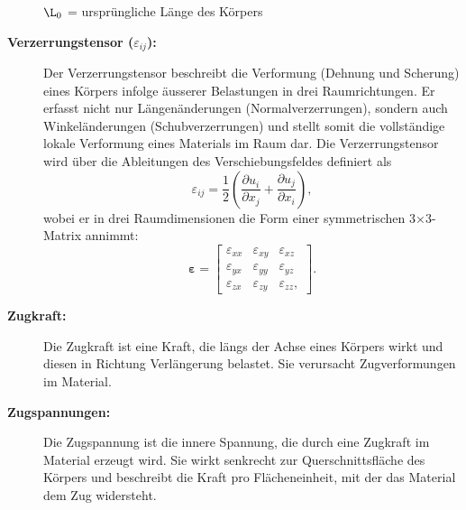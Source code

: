 \begin{description}
	$\L_0$ = ursprüngliche Länge des Körpers
	
\item[\textbf{Verzerrungstensor ($\varepsilon_{ij}$):}] Der Verzerrungstensor beschreibt die Verformung (Dehnung und Scherung) eines Körpers infolge äusserer Belastungen in drei Raumrichtungen. 
Er erfasst nicht nur Längenänderungen (Normalverzerrungen), sondern auch Winkeländerungen (Schubverzerrungen) und stellt somit die vollständige lokale Verformung eines Materials im Raum dar.
Die Verzerrungstensor wird über die Ableitungen des Verschiebungsfeldes definiert als
	\begin{equation}
		\varepsilon_{ij} = 
		\frac{1}{2} \left( \frac{\partial u_i}{\partial x_j} + \frac{\partial u_j}{\partial x_i} \right),
	\end{equation}
	wobei er in drei Raumdimensionen die Form einer symmetrischen 3×3-Matrix annimmt:
	\begin{equation}
		\boldsymbol{\varepsilon} =
		\begin{bmatrix}
			\varepsilon_{xx} & \varepsilon_{xy} & \varepsilon_{xz} \\
			\varepsilon_{yx} & \varepsilon_{yy} & \varepsilon_{yz} \\
			\varepsilon_{zx} & \varepsilon_{zy} & \varepsilon_{zz},
		\end{bmatrix}.
	\end{equation}
\item[\textbf{Zugkraft:}] Die Zugkraft ist eine Kraft, die längs der Achse eines Körpers wirkt und diesen in Richtung Verlängerung belastet. 
Sie verursacht Zugverformungen im Material.
	
\item[\textbf{Zugspannungen:}] Die Zugspannung ist die innere Spannung, die durch eine Zugkraft im Material erzeugt wird. 
Sie wirkt senkrecht zur Querschnittsfläche des Körpers und beschreibt die Kraft pro Flächeneinheit, mit der das Material dem Zug widersteht.
\end{description}

